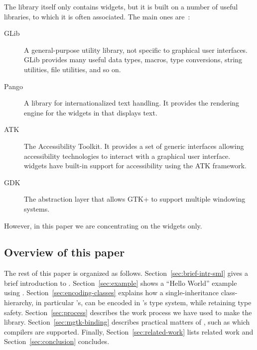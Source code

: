 \documentclass[workingdraft]{usetex-v1}
\begin{document}
The \gtk library itself only contains widgets, but it is built on a
number of useful libraries, to which it is often associated. The main
ones are~\cite{gtk-reference-manual}:
\begin{description}
\item[GLib] A general-purpose utility library, not specific to
  graphical user interfaces. GLib provides many useful data types,
  macros, type conversions, string utilities, file utilities, and so
  on.

\item[Pango] A library for internationalized text handling. It
  provides the rendering engine for the widgets in \gtk that displays
  text.

\item[ATK] The Accessibility Toolkit. It provides a set of generic
  interfaces allowing accessibility technologies to interact with a
  graphical user interface.  \gtk widgets have built-in support for
  accessibility using the ATK framework.

\item[GDK] The abstraction layer that allows GTK+ to support multiple
  windowing systems.
\end{description}
However, in this paper we are concentrating on the widgets only.






\subsection{Overview of this paper}
\label{sec:overview-this-paper}

The rest of this paper is organized as follows.
Section~\ref{sec:brief-intr-sml} gives a brief introduction to \sml.
Section~\ref{sec:example} shows a ``Hello World'' example using \mgtk.
Section~\ref{sec:encoding-classes} explains how a single-inheritance
class-hierarchy, in particular \gtk's, can be encoded in \sml's type
system, while retaining type safety.  Section~\ref{sec:process}
describes the work process we have used to make the \mgtk library.
Section~\ref{sec:mgtk-binding} describes practical matters of \mgtk,
such as which \sml compilers are supported.  Finally,
Section~\ref{sec:related-work} lists related work and
Section~\ref{sec:conclusion} concludes.
\end{document}
